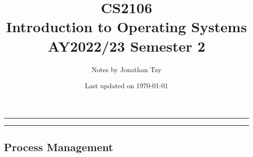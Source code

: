 \documentclass{article}
\title{\vspace{-1cm}\textbf{CS2106 \\[0.25em] Introduction to Operating Systems} \\[2em] \Large AY2022/23 Semester 2 \\[1em]}
\author{Notes by Jonathan Tay}
\date{Last updated on \today}
\newcommand{\pageline}[1]{\par\noindent\rule{\textwidth}{#1}} %
\begin{document}
\linespread{1.4}\selectfont
{} %
\maketitle
\pageline{1.5pt}
\tableofcontents
\pageline{1.5pt}
\linespread{1.1}\selectfont

\newpage
{} %
\begin{multicols*}{2}
    \part{Process Management}
    
\end{multicols*}
\end{document}
